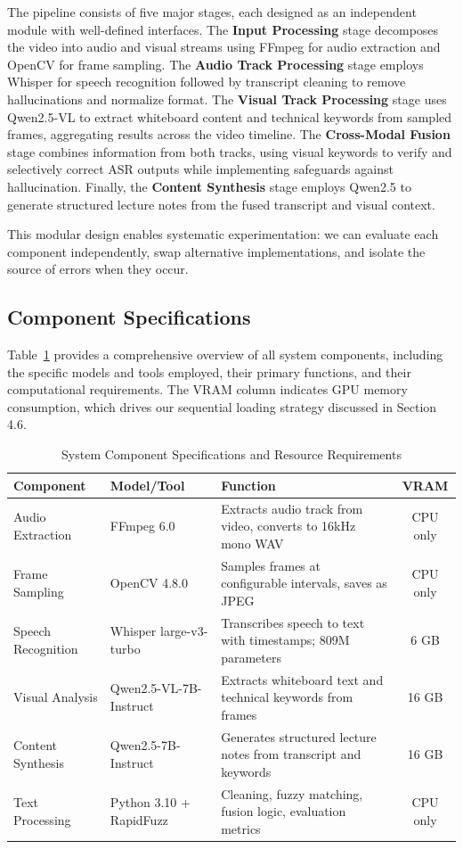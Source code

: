 The pipeline consists of five major stages, each designed as an independent module with well-defined interfaces. The \textbf{Input Processing} stage decomposes the video into audio and visual streams using FFmpeg for audio extraction and OpenCV for frame sampling. The \textbf{Audio Track Processing} stage employs Whisper for speech recognition followed by transcript cleaning to remove hallucinations and normalize format. The \textbf{Visual Track Processing} stage uses Qwen2.5-VL to extract whiteboard content and technical keywords from sampled frames, aggregating results across the video timeline. The \textbf{Cross-Modal Fusion} stage combines information from both tracks, using visual keywords to verify and selectively correct ASR outputs while implementing safeguards against hallucination. Finally, the \textbf{Content Synthesis} stage employs Qwen2.5 to generate structured lecture notes from the fused transcript and visual context.

This modular design enables systematic experimentation: we can evaluate each component independently, swap alternative implementations, and isolate the source of errors when they occur.

\subsection{Component Specifications}

Table~\ref{tab:components} provides a comprehensive overview of all system components, including the specific models and tools employed, their primary functions, and their computational requirements. The VRAM column indicates GPU memory consumption, which drives our sequential loading strategy discussed in Section 4.6.

\begin{table}[h]
\centering
\caption{System Component Specifications and Resource Requirements}
\label{tab:components}
\begin{tabular}{|l|l|p{5cm}|c|}
\hline
\textbf{Component} & \textbf{Model/Tool} & \textbf{Function} & \textbf{VRAM} \\
\hline
Audio Extraction & FFmpeg 6.0 & Extracts audio track from video, converts to 16kHz mono WAV & CPU only \\
\hline
Frame Sampling & OpenCV 4.8.0 & Samples frames at configurable intervals, saves as JPEG & CPU only \\
\hline
Speech Recognition & Whisper large-v3-turbo & Transcribes speech to text with timestamps; 809M parameters & 6 GB \\
\hline
Visual Analysis & Qwen2.5-VL-7B-Instruct & Extracts whiteboard text and technical keywords from frames & 16 GB \\
\hline
Content Synthesis & Qwen2.5-7B-Instruct & Generates structured lecture notes from transcript and keywords & 16 GB \\
\hline
Text Processing & Python 3.10 + RapidFuzz & Cleaning, fuzzy matching, fusion logic, evaluation metrics & CPU only \\
\hline
\end{tabular}
\end{table}

